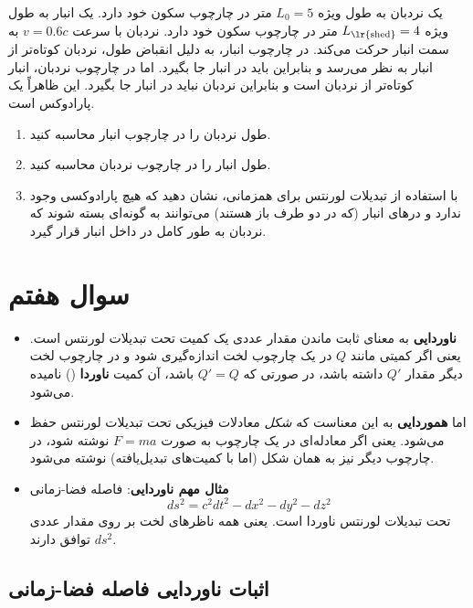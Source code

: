 \documentclass[a4paper,18pt]{article}
\begin{document}
	یک نردبان به طول ویژه \( L_0 = 5 \) متر در چارچوب سکون خود دارد. یک انبار به طول ویژه \( L_{\text{\lr{shed}}} = 4 \) متر در چارچوب سکون خود دارد. نردبان با سرعت \( v = 0.6c \) به سمت انبار حرکت می‌کند. در چارچوب انبار، به دلیل انقباض طول، نردبان کوتاه‌تر از انبار به نظر می‌رسد و بنابراین باید در انبار جا بگیرد. اما در چارچوب نردبان، انبار کوتاه‌تر از نردبان است و بنابراین نردبان نباید در انبار جا بگیرد. این ظاهراً یک پارادوکس است.
	
	\begin{enumerate}
		\item[(الف)] طول نردبان را در چارچوب انبار محاسبه کنید.
		\item[(ب)] طول انبار را در چارچوب نردبان محاسبه کنید.
		\item[(پ)] با استفاده از تبدیلات لورنتس برای همزمانی، نشان دهید که هیچ پارادوکسی وجود ندارد و درهای انبار (که در دو طرف باز هستند) می‌توانند به گونه‌ای بسته شوند که نردبان به طور کامل در داخل انبار قرار گیرد.
	\end{enumerate}
	
	
	
	\section{سوال هفتم}
	
	\begin{itemize}
		\item \textbf{ناوردایی} به معنای ثابت ماندن مقدار عددی یک کمیت تحت تبدیلات لورنتس است. یعنی اگر کمیتی مانند \( Q \) در یک چارچوب لخت اندازه‌گیری شود و در چارچوب لخت دیگر مقدار \( Q' \) داشته باشد، در صورتی که \( Q' = Q \) باشد، آن کمیت \textbf{ناوردا} () نامیده می‌شود.
		
		\item اما \textbf{هموردایی} به این معناست که \textit{شکل} معادلات فیزیکی تحت تبدیلات لورنتس حفظ می‌شود. یعنی اگر معادله‌ای در یک چارچوب به صورت \( F = ma \) نوشته شود، در چارچوب دیگر نیز به همان شکل (اما با کمیت‌های تبدیل‌یافته) نوشته می‌شود.
		
		\item \textbf{مثال مهم ناوردایی}: فاصله فضا-زمانی 
		\[
		ds^2 = c^2 dt^2 - dx^2 - dy^2 - dz^2
		\]
		تحت تبدیلات لورنتس ناوردا است. یعنی همه ناظرهای لخت بر روی مقدار عددی \( ds^2 \) توافق دارند.
	\end{itemize}
	
	\subsection*{ اثبات ناوردایی فاصله فضا-زمانی}
	
\end{document}
